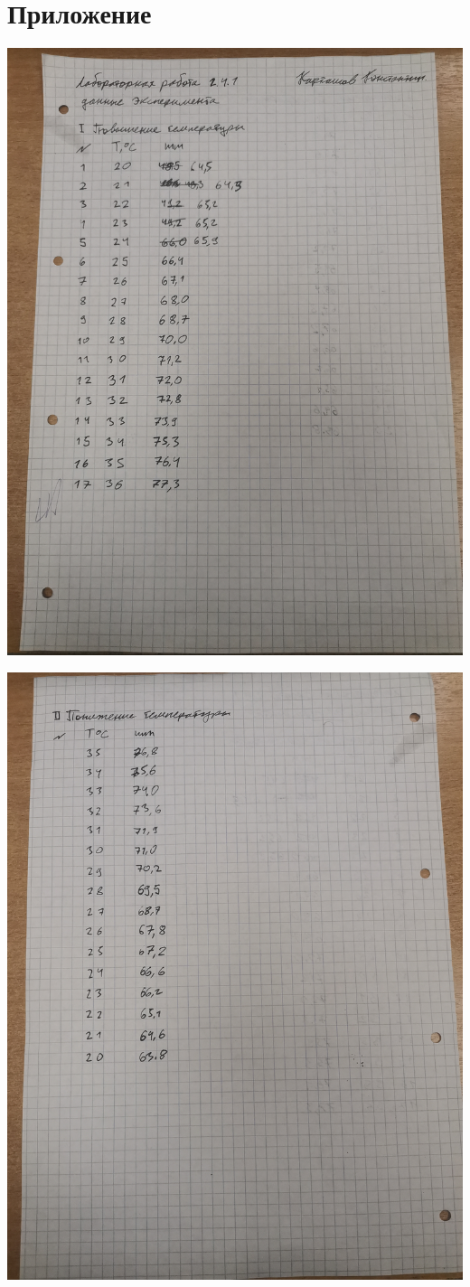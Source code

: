 \documentclass[a4paper,12pt]{article} %
\begin{document}
\section{Приложение}

\includegraphics[width=1\textwidth]{page_1.jpg}

\includegraphics[width=1\textwidth]{page_2.jpg}
\end{document}
